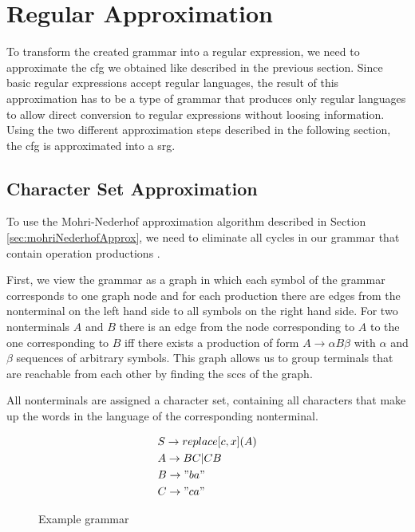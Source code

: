 \section{Regular Approximation}\label{sec:approximation}

To transform the created grammar into a regular expression, we need to approximate the \ac{cfg} we obtained like described in the previous section. Since basic regular expressions accept regular languages, the result of this approximation has to be a type of grammar that produces only regular languages to allow direct conversion to regular expressions without loosing information. Using the two different approximation steps described in the following section, the \ac{cfg} is approximated into a \acl{srg}.

\subsection{Character Set Approximation}\label{sec:charsetApprox}
To use the Mohri-Nederhof approximation algorithm described in Section \ref{sec:mohriNederhofApprox}, we need to eliminate all cycles in our grammar that contain operation productions \cite{mohri_nederhof}.

First, we view the grammar as a graph in which each symbol of the grammar corresponds to one graph node and for each production there are edges from the nonterminal on the left hand side to all symbols on the right hand side. 
For two nonterminals $A$ and $B$ there is an edge from the node corresponding to $A$ to the one corresponding to $B$ iff there exists a production of form $A \rightarrow \alpha B \beta$ with $\alpha$ and $\beta$ sequences of arbitrary symbols.
This graph allows us to group terminals that are reachable from each other by finding the \acp{scc} of the graph.

All nonterminals are assigned a character set, containing all characters that make up the words in the language of the corresponding nonterminal.

\begin{figure}[!h]
	\begin{align*}
		&S \rightarrow replace[c, x](A)\\
		&A \rightarrow BC | CB\\
		&B \rightarrow "ba"\\
		&C \rightarrow "ca"
	\end{align*}
	\caption{Example grammar}
	\label{fig:charset:grammar}
\end{figure}

